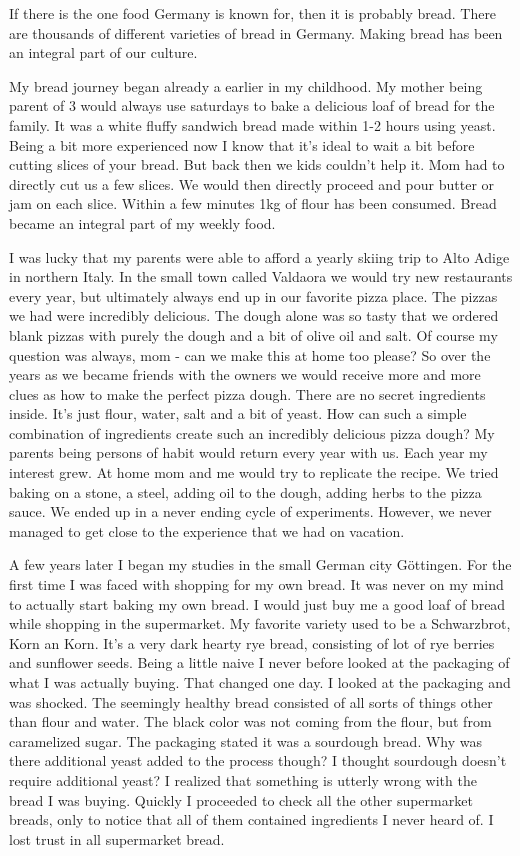 If there is the one food Germany is known for, then it is probably bread.
There are thousands of different varieties of bread in Germany.
Making bread has been an integral part of our culture.

My bread journey began already a earlier in my childhood. My mother being parent
of 3 would always use saturdays to bake a delicious loaf of bread for the family.
It was a white fluffy sandwich bread made within 1-2 hours using yeast.
Being a bit more experienced now I know that it's
ideal to wait a bit before cutting slices of your bread. But back then
we kids couldn't help it. Mom had to directly cut us a few slices. We would then
directly proceed and pour butter or jam on each slice. Within a few minutes 1kg of
flour has been consumed. Bread became an integral part of my weekly food.

I was lucky that my parents were able to afford a yearly skiing trip to
Alto Adige in northern Italy. In the small town called Valdaora we
would try new restaurants every year, but ultimately always end up in our favorite
pizza place. The pizzas we had were incredibly delicious. The dough
alone was so tasty that we ordered blank pizzas with purely the dough and a
bit of olive oil and salt.
Of course my question was always, mom - can we make this at home too please?
So over the years as we became friends with the owners we would receive
more and more clues as how to make the perfect pizza dough. There
are no secret ingredients inside. It's just flour, water, salt and a bit of yeast.
How can such a simple combination of ingredients create such an incredibly delicious
pizza dough? My parents being persons of habit would return every year with us.
Each year my interest grew. At home mom and me would try to replicate
the recipe. We tried baking on a stone, a steel, adding oil to the dough,
adding herbs to the pizza sauce. We ended up in a never ending cycle
of experiments. However, we never managed to get close to the experience
that we had on vacation.

A few years later I began my studies in the small German city Göttingen.
For the first time I was faced with shopping for my own bread. It was never
on my mind to actually start baking my own bread. I would just buy me
a good loaf of bread while shopping in the supermarket. My favorite variety
used to be a Schwarzbrot, Korn an Korn. It's a very dark hearty rye bread,
consisting of lot of rye berries and sunflower seeds. Being a little naive
I never before looked at the packaging of what I was actually buying. That
changed one day. I looked at the packaging and was shocked. The seemingly
healthy bread consisted of all sorts of things other than flour and water.
The black color was not coming from the flour, but from caramelized sugar.
The packaging stated it was a sourdough bread. Why was there additional yeast
added to the process though? I thought sourdough doesn't require additional
yeast? I realized that something is utterly wrong with the bread I was buying.
Quickly I proceeded to check all the other supermarket breads, only to
notice that all of them contained ingredients I never heard of. I lost trust
in all supermarket bread.

